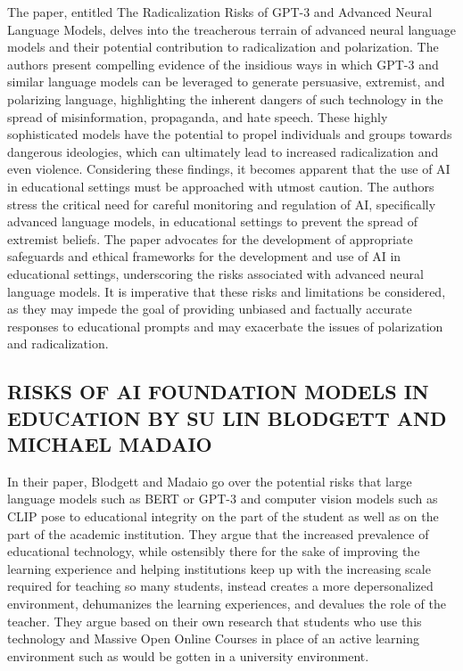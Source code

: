 \documentclass[letterpaper, 10pt, conference]{ieeeconf}
\begin{document}
        The paper, entitled The Radicalization Risks of GPT-3 and Advanced Neural Language Models, delves into the treacherous terrain of advanced neural language models and their potential contribution to radicalization and polarization. The authors present compelling evidence of the insidious ways in which GPT-3 and similar language models can be leveraged to generate persuasive, extremist, and polarizing language, highlighting the inherent dangers of such technology in the spread of misinformation, propaganda, and hate speech. These highly sophisticated models have the potential to propel individuals and groups towards dangerous ideologies, which can ultimately lead to increased radicalization and even violence.
	Considering these findings, it becomes apparent that the use of AI in educational settings must be approached with utmost caution. The authors stress the critical need for careful monitoring and regulation of AI, specifically advanced language models, in educational settings to prevent the spread of extremist beliefs. The paper advocates for the development of appropriate safeguards and ethical frameworks for the development and use of AI in educational settings, underscoring the risks associated with advanced neural language models. It is imperative that these risks and limitations be considered, as they may impede the goal of providing unbiased and factually accurate responses to educational prompts and may exacerbate the issues of polarization and radicalization.

        \subsection{RISKS OF AI FOUNDATION MODELS IN EDUCATION BY SU LIN BLODGETT AND MICHAEL MADAIO}

    In their paper, Blodgett and Madaio go over the potential risks that large language models such as BERT or GPT-3 and computer vision models such as CLIP pose to educational integrity on the part of the student as well as on the part of the academic institution. They argue that the increased prevalence of educational technology, while ostensibly there for the sake of improving the learning experience and helping institutions keep up with the increasing scale required for teaching so many students, instead creates a more depersonalized environment, dehumanizes the learning experiences, and devalues the role of the teacher. They argue based on their own research that students who use this technology and Massive Open Online Courses in place of an active learning environment such as would be gotten in a university environment.
\end{document}
